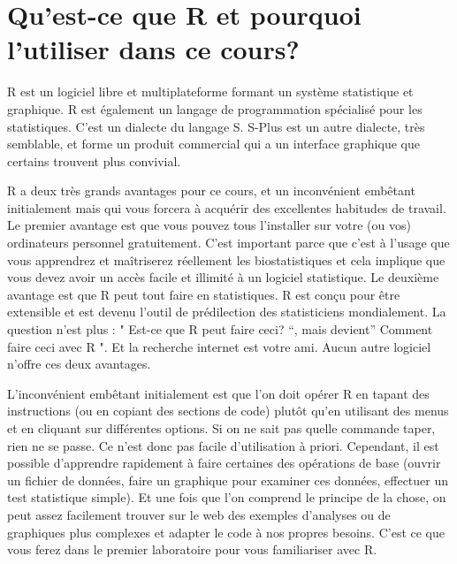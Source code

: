 \documentclass[12pt,]{book}
\begin{document}
\hypertarget{quest-ce-que-r-et-pourquoi-lutiliser-dans-ce-cours}{%
\section*{Qu'est-ce que R et pourquoi l'utiliser dans ce cours?}\label{quest-ce-que-r-et-pourquoi-lutiliser-dans-ce-cours}}


R est un logiciel libre et multiplateforme formant un système statistique et graphique.
R est également un langage de programmation spécialisé pour les statistiques.
C'est un dialecte du langage S.
S-Plus est un autre dialecte, très semblable, et forme un produit commercial qui a un interface graphique que certains trouvent plus convivial.

R a deux très grands avantages pour ce cours, et un inconvénient embêtant initialement mais qui vous forcera à acquérir des excellentes habitudes de travail.
Le premier avantage est que vous pouvez tous l'installer sur votre (ou vos) ordinateurs personnel gratuitement.
C'est important parce que c'est à l'usage que vous apprendrez et maîtriserez réellement les biostatistiques et cela implique que vous devez avoir un accès facile et illimité à un logiciel statistique.
Le deuxième avantage est que R peut tout faire en statistiques.
R est conçu pour être extensible et est devenu l'outil de prédilection des statisticiens mondialement.
La question n'est plus : " Est-ce que R peut faire ceci? ``, mais devient'' Comment faire ceci avec R ".
Et la recherche internet est votre ami.
Aucun autre logiciel n'offre ces deux avantages.

L'inconvénient embêtant initialement est que l'on doit opérer R en tapant des instructions (ou en copiant des sections de code) plutôt qu'en utilisant des menus et en cliquant sur différentes options.
Si on ne sait pas quelle commande taper, rien ne se passe.
Ce n'est donc pas facile d'utilisation à priori.
Cependant, il est possible d'apprendre rapidement à faire certaines des opérations de base (ouvrir un fichier de données, faire un graphique pour examiner ces données, effectuer un test statistique simple).
Et une fois que l'on comprend le principe de la chose, on peut assez facilement trouver sur le web des exemples d'analyses ou de graphiques plus complexes et adapter le code à nos propres besoins.
C'est ce que vous ferez dans le premier laboratoire pour vous familiariser avec R.
\end{document}
